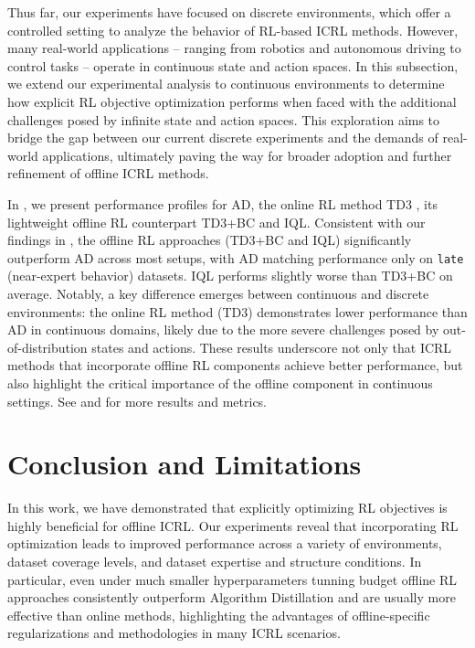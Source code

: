 \documentclass{article} %
\begin{document}
Thus far, our experiments have focused on discrete environments, which offer a controlled setting to analyze the behavior of RL-based ICRL methods. However, many real-world applications -- ranging from robotics and autonomous driving to control tasks -- operate in continuous state and action spaces. In this subsection, we extend our experimental analysis to continuous environments to determine how explicit RL objective optimization performs when faced with the additional challenges posed by infinite state and action spaces. This exploration aims to bridge the gap between our current discrete experiments and the demands of real-world applications, ultimately paving the way for broader adoption and further refinement of offline ICRL methods.

In , we present performance profiles for AD, the online RL method TD3 \citep{fujimoto2018addressing}, its lightweight offline RL counterpart TD3+BC \citep{fujimoto2021minimalist} and IQL. Consistent with our findings in , the offline RL approaches (TD3+BC and IQL) significantly outperform AD across most setups, with AD matching performance only on \texttt{late} (near-expert behavior) datasets. IQL performs slightly worse than TD3+BC on average. Notably, a key difference emerges between continuous and discrete environments: the online RL method (TD3) demonstrates lower performance than AD in continuous domains, likely due to the more severe challenges posed by out-of-distribution states and actions. These results underscore not only that ICRL methods that incorporate offline RL components achieve better performance, but also highlight the critical importance of the offline component in continuous settings. See  and  for more results and metrics.

\section{Conclusion and Limitations}
In this work, we have demonstrated that explicitly optimizing RL objectives is highly beneficial for offline ICRL. Our experiments reveal that incorporating RL optimization leads to improved performance across a variety of environments, dataset coverage levels, and dataset expertise and structure conditions. In particular, even under much smaller hyperparameters tunning budget offline RL approaches consistently outperform Algorithm Distillation and are usually more effective than online methods, highlighting the advantages of offline-specific regularizations and methodologies in many ICRL scenarios.
\end{document}
